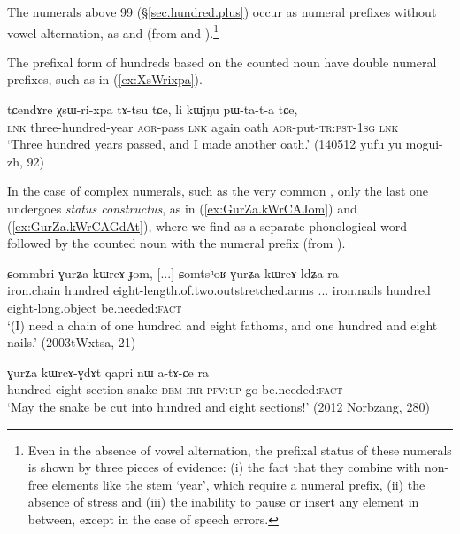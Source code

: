 The numerals above 99 (§\ref{sec.hundred.plus}) occur as numeral prefixes without vowel alternation, as  and  (from  and ).\footnote{Even in the absence of vowel alternation, the prefixal status of these numerals is shown by three pieces of evidence: (i) the fact that they combine with non-free elements like the stem  `year', which require a numeral prefix, (ii) the absence of stress and (iii) the inability to pause or insert any element in between, except in the case of speech errors. } 

The prefixal form of hundreds based on the counted noun  have double numeral prefixes, such as  in (\ref{ex:XsWrixpa}).

\begin{exe}
\ex \label{ex:XsWrixpa}
\gll tɕendɤre χsɯ-ri-xpa tɤ-tsu tɕe, li kɯjŋu pɯ-ta-t-a tɕe, \\
 \textsc{lnk} three-hundred-year \textsc{aor}-pass \textsc{lnk} again oath \textsc{aor}-put-\textsc{tr}:\textsc{pst}-\textsc{1sg} \textsc{lnk} \\
\glt `Three hundred years passed, and I made another oath.' (140512 yufu yu mogui-zh, 92)
\end{exe}

In the case of complex numerals, such as the very common , only the last one undergoes \textit{status constructus}, as in (\ref{ex:GurZa.kWrCAJom}) and (\ref{ex:GurZa.kWrCAGdAt}), where we find  as a separate phonological word followed by the counted noun with the numeral prefix  (from ).

\begin{exe}
\ex \label{ex:GurZa.kWrCAJom}
\gll ɕommbri ɣurʑa kɯrcɤ-ɟom, [...] ɕomtsʰoʁ ɣurʑa kɯrcɤ-ldʑa ra \\
iron.chain hundred eight-length.of.two.outstretched.arms ... iron.nails hundred eight-long.object be.needed:\textsc{fact} \\
\glt  `(I) need a chain of one hundred and eight fathoms, and one hundred and eight nails.' (2003tWxtsa, 21)
\end{exe}

\begin{exe}
\ex \label{ex:GurZa.kWrCAGdAt}
\gll  ɣurʑa kɯrcɤ-ɣdɤt qapri nɯ a-tɤ-ɕe ra \\
 hundred eight-section snake \textsc{dem} \textsc{irr}-\textsc{pfv}:\textsc{up}-go be.needed:\textsc{fact} \\
\glt `May the snake be cut into hundred and eight sections!' (2012 Norbzang,  280)
\end{exe}

